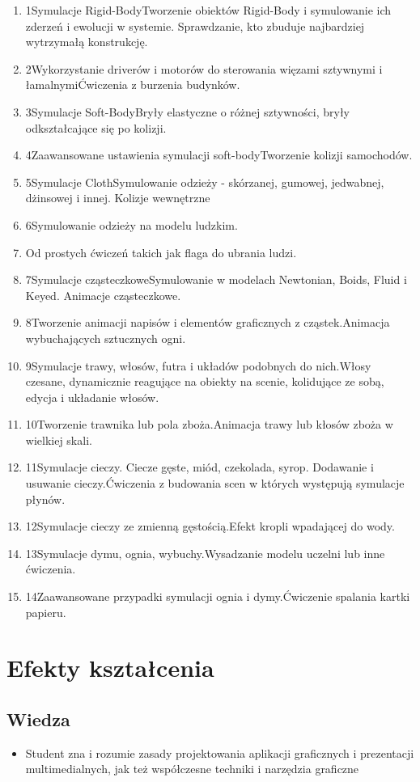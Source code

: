 \documentclass[12pt, a4paper]{article}
\begin{document}
\begin{enumerate}
  \item 1Symulacje Rigid-BodyTworzenie obiektów Rigid-Body i symulowanie ich zderzeń i ewolucji w systemie. Sprawdzanie, kto zbuduje najbardziej wytrzymałą konstrukcję.
  \item 2Wykorzystanie driverów i motorów do sterowania więzami sztywnymi i łamalnymiĆwiczenia z burzenia budynków.
  \item 3Symulacje Soft-BodyBryły elastyczne o różnej sztywności, bryły odkształcające się po kolizji.
  \item 4Zaawansowane ustawienia symulacji soft-bodyTworzenie kolizji samochodów.
  \item 5Symulacje ClothSymulowanie odzieży - skórzanej, gumowej, jedwabnej, dżinsowej i innej. Kolizje wewnętrzne
  \item 6Symulowanie odzieży na modelu ludzkim.
  \item Od prostych ćwiczeń takich jak flaga do ubrania ludzi.
  \item 7Symulacje cząsteczkoweSymulowanie w modelach Newtonian, Boids, Fluid i Keyed. Animacje cząsteczkowe.
  \item 8Tworzenie animacji napisów i elementów graficznych z cząstek.Animacja wybuchających sztucznych ogni.
  \item 9Symulacje trawy, włosów, futra i układów podobnych do nich.Włosy czesane, dynamicznie reagujące na obiekty na scenie, kolidujące ze sobą, edycja i układanie włosów.
  \item 10Tworzenie trawnika lub pola zboża.Animacja trawy lub kłosów zboża w wielkiej skali.
  \item 11Symulacje cieczy. Ciecze gęste, miód, czekolada, syrop. Dodawanie i usuwanie cieczy.Ćwiczenia z budowania scen w których występują symulacje płynów.
  \item 12Symulacje cieczy ze zmienną gęstością.Efekt kropli wpadającej do wody.
  \item 13Symulacje dymu, ognia, wybuchy.Wysadzanie modelu uczelni lub inne ćwiczenia.
  \item 14Zaawansowane przypadki symulacji ognia i dymy.Ćwiczenie spalania kartki papieru.
\end{enumerate}

\section{Efekty kształcenia}

\subsection*{Wiedza}
\begin{itemize}
  \item Student zna i rozumie zasady projektowania aplikacji graficznych i prezentacji multimedialnych, jak też współczesne techniki i narzędzia graficzne
\end{itemize}
\end{document}
